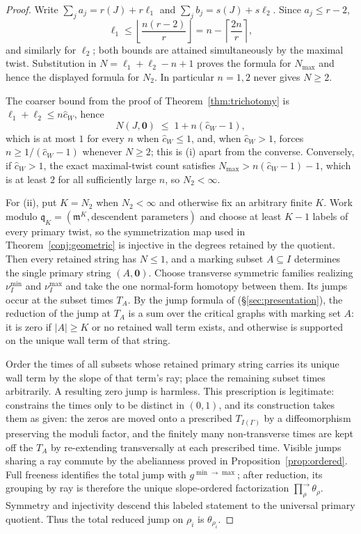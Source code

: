 \documentclass[11pt]{amsart}
\theoremstyle{definition}
\theoremstyle{remark}
\newcommand{\chat}{\hat{c}}
\begin{document}
\begin{proof}
Write $\sum_j a_j=r(J)+r\ell_1$ and
$\sum_j b_j=s(J)+s\ell_2$. Since $a_j\le r-2$,
\[
\ell_1\le\left\lfloor\frac{n(r-2)}r\right\rfloor
=n-\left\lceil\frac{2n}{r}\right\rceil,
\]
and similarly for $\ell_2$; both bounds are attained simultaneously by the
maximal twist. Substitution in
$N=\ell_1+\ell_2-n+1$ proves the formula for $N_{\max}$ and hence the displayed
formula for $N_2$. In particular $n=1,2$ never gives $N\ge2$.

The coarser bound from the proof of Theorem~\ref{thm:trichotomy} is
$\ell_{1}+\ell_{2}\le n\chat_{W}$, hence
\begin{equation}
\label{eq:Nbound}
N(J,\mathbf 0)\;\le\;1+n(\chat_{W}-1),
\end{equation}
which is at most $1$ for every $n$ when $\chat_{W}\le1$, and, when
$\chat_W>1$, forces $n\ge1/(\chat_{W}-1)$ whenever $N\ge2$; this is (i)
apart from the converse.
Conversely, if $\chat_{W}>1$, the exact maximal-twist count satisfies
$N_{\max}>n(\chat_{W}-1)-1$, which is at least $2$ for all sufficiently large
$n$, so $N_{2}<\infty$.

For (ii), put $K=N_2$ when $N_2<\infty$ and otherwise fix an arbitrary finite
$K$. Work modulo $\mathfrak q_K=(\mathfrak m^K,\text{descendent parameters})$ and choose
at least $K-1$ labels of every primary twist, so the symmetrization map used in
Theorem~\ref{conj:geometric} is injective in the degrees retained by the quotient. Then every
retained string has $N\le1$, and a marking subset $A\subseteq I$ determines
the single primary string $(A,\mathbf0)$. Choose transverse symmetric families
realizing $\nu_I^{\min}$ and $\nu_I^{\max}$ and take the one normal-form
homotopy between them. Its jumps occur at the subset times $T_A$. By the jump
formula of \cite[proof of Thm.~5.9]{GKT} (\S\ref{sec:presentation}), the
reduction of the jump at
$T_A$ is a sum over the critical graphs with marking set $A$: it is zero if
$|A|\ge K$ or no retained wall term exists, and otherwise is supported on the
unique wall term of that string.

Order the times of all subsets whose retained primary string carries its
unique wall term by the slope of that term's ray; place the remaining subset
times arbitrarily. A resulting zero jump is harmless. This prescription is legitimate:
\cite[Lem.~3.40]{GKT} constrains the times only to be distinct in $(0,1)$, and its
construction takes them as given: the zeros are moved onto a prescribed
$T_{I(\Gamma)}$ by a diffeomorphism preserving the moduli factor, and the
finitely many non-transverse times are kept off the $T_{A}$ by re-extending
transversally at each prescribed time. Visible jumps sharing a ray commute by the abelianness proved in
Proposition~\ref{prop:ordered}. Full freeness identifies the total jump
with $g^{\min\to\max}$; after reduction, its grouping by ray is therefore the
unique slope-ordered factorization
$\prod^{\rightarrow}_{\rho}\theta_{\rho}$. Symmetry and injectivity descend
this labeled statement to the universal primary quotient. Thus the total
reduced jump on $\rho_i$ is $\theta_{\rho_i}$.
\end{proof}
\end{document}
